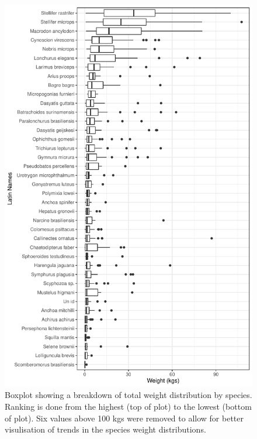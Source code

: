 \documentclass[
]{book}
\begin{document}
\begin{figure}

{\centering \includegraphics{bookdown-demo_files/figure-latex/unnamed-chunk-8-1} 

}

\caption{Boxplot showing a breakdown of total weight distribution by species. Ranking is done from the highest (top of plot) to the lowest (bottom of plot). Six values above 100 kgs were removed to allow for better visulisation of trends in the species weight distributions.}\label{fig:unnamed-chunk-8}
\end{figure}
\end{document}
